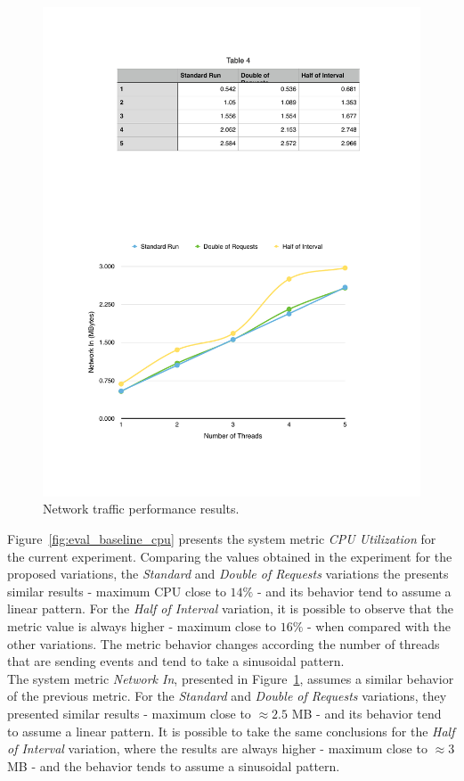         \begin{figure}[ht!]
          \centering
          \includegraphics[width=.7\textwidth]{./images/network_1_lap}
          \caption{Network traffic performance results.}
          \label{fig:eval_baseline_network}
        \end{figure}

        Figure~\ref{fig:eval_baseline_cpu} presents the system metric \textit{CPU Utilization} for the current
        experiment. Comparing the values obtained in the experiment for the proposed variations, the
        \textit{Standard} and \textit{Double of Requests} variations the presents similar results -
        maximum \gls{CPU} close to $14\%$ - and its behavior tend to assume a linear pattern. For the \textit{Half of Interval}
        variation, it is possible to observe that the metric value is always higher - maximum close to $16\%$ -
        when compared with the other variations. The metric behavior changes according the number of threads
        that are sending events and tend to take a sinusoidal pattern.\\

        The system metric \textit{Network In}, presented in Figure~\ref{fig:eval_baseline_network}, assumes a
        similar behavior of the previous metric. For the \textit{Standard} and \textit{Double of Requests} variations,
        they presented similar results - maximum close to $\approx2.5$ \gls{MB} - and its behavior tend to assume a linear
        pattern. It is possible to take the same conclusions for the \textit{Half of Interval} variation,
        where the results are always higher - maximum close to $\approx3$ \gls{MB} - and the behavior tends to assume
        a sinusoidal pattern.

